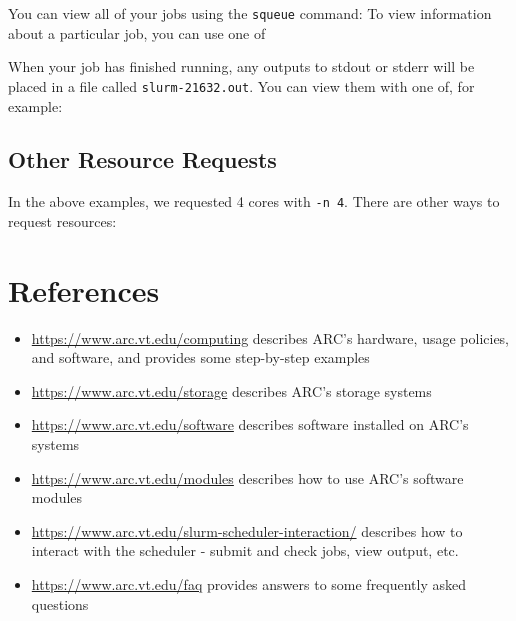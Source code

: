 You can view all of your jobs using the \texttt{squeue} command:
To view information about a particular job, you can use one of


When your job has finished running, any outputs to stdout or stderr will be placed in a file called \texttt{slurm-21632.out}. You can view them with one of, for example:

\subsection{Other Resource Requests}
In the above examples, we requested 4 cores with \texttt{-n 4}. There are other ways to request resources:


\section{References}
\begin{itemize}
	\item \url{https://www.arc.vt.edu/computing} describes ARC's hardware, usage policies, and software, and provides some step-by-step examples
	\item \url{https://www.arc.vt.edu/storage} describes ARC's storage systems
	\item \url{https://www.arc.vt.edu/software} describes software installed on ARC's systems
	\item \url{https://www.arc.vt.edu/modules} describes how to use ARC's software modules
	\item \url{https://www.arc.vt.edu/slurm-scheduler-interaction/} describes how to interact with the scheduler - submit and check jobs, view output, etc.
	\item \url{https://www.arc.vt.edu/faq} provides answers to some frequently asked questions
\end{itemize}

